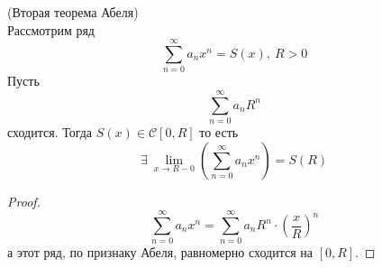 \begin{theorem} (Вторая теорема Абеля)\\
    Рассмотрим ряд 
    \[\sum_{n=0}^{\infty}a_n x^n=S(x),\ R>0\]
    Пусть 
    \[\sum_{n=0}^{\infty}a_n R^n\]
    сходится. Тогда $S(x)\in \mathcal{C}[0,R]$ то есть
    \[\exists\ \lim\limits_{x\to R-0}\left(\sum_{n=0}^{\infty}a_n x^n\right)=S(R)\]
\end{theorem}
\begin{proof}
    \[\sum_{n=0}^{\infty}a_n x^n=\sum_{n=0}^{\infty}a_n R^n\cdot \left(\frac{x}{R}\right)^n\]
    а этот ряд, по признаку Абеля, равномерно сходится на $[0,R]$.
\end{proof}